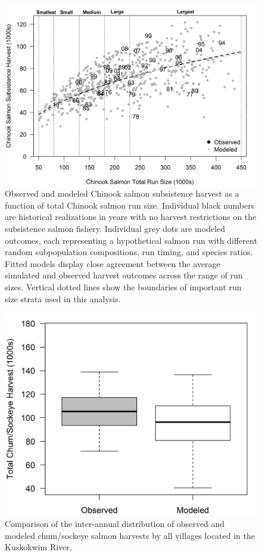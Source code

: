 \documentclass[12pt,]{book}
\theoremstyle{definition}
\theoremstyle{definition}
\theoremstyle{definition}
\theoremstyle{remark}
\begin{document}
\begin{figure}
  \centering
  \includegraphics{img/Ch3/Figure B1.jpg}
  \caption{Observed and modeled Chinook salmon subsistence harvest as a function of total Chinook salmon run size. Individual black numbers are historical realizations in years with no harvest restrictions on the subsistence salmon fishery. Individual grey dots are modeled outcomes, each representing a hypothetical salmon run with different random subpopulation compositions, run timing, and species ratios. Fitted models display close agreement between the average simulated and observed harvest outcomes across the range of run sizes. Vertical dotted lines show the boundaries of important run size strata used in this analysis.}
  \label{fig:HvN}
\end{figure}

\begin{figure}
  \centering
  \includegraphics{img/Ch3/Figure B2.jpg}
  \caption{Comparison of the inter-annual distribution of observed and modeled chum/sockeye salmon harvests by all villages located in the Kuskokwim River.}
  \label{fig:chsk-harvest}
\end{figure}
\end{document}
